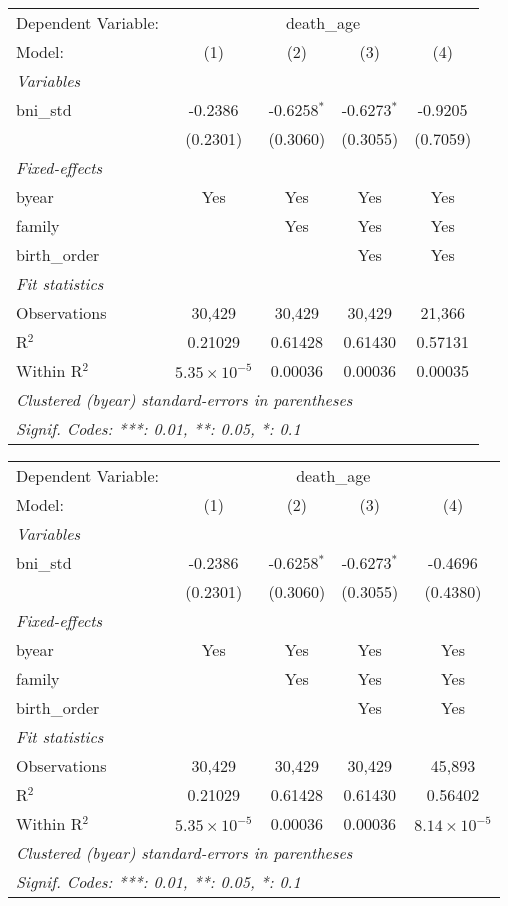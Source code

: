 \begin{tabular}{lcccc}
\tabularnewline\midrule\midrule
Dependent Variable: & \multicolumn{4}{c}{death\_age}\\
Model: & (1) & (2) & (3) & (4)\\
\midrule \emph{Variables} &   &   &   &  \\
bni\_std & -0.2386 & -0.6258$^{*}$ & -0.6273$^{*}$ & -0.9205\\
  & (0.2301) & (0.3060) & (0.3055) & (0.7059)\\
\midrule \emph{Fixed-effects} &   &   &   &  \\
byear & Yes & Yes & Yes & Yes\\
family &  & Yes & Yes & Yes\\
birth\_order &  &  & Yes & Yes\\
\midrule \emph{Fit statistics} &   &   &   &  \\
Observations & 30,429 & 30,429 & 30,429 & 21,366\\
R$^2$ & 0.21029 & 0.61428 & 0.61430 & 0.57131\\
Within R$^2$ & $5.35\times 10^{-5}$ & 0.00036 & 0.00036 & 0.00035\\
\midrule\midrule\multicolumn{5}{l}{\emph{Clustered (byear) standard-errors in parentheses}}\\
\multicolumn{5}{l}{\emph{Signif. Codes: ***: 0.01, **: 0.05, *: 0.1}}\\
\end{tabular}



\begin{tabular}{lcccc}
\tabularnewline\midrule\midrule
Dependent Variable: & \multicolumn{4}{c}{death\_age}\\
Model: & (1) & (2) & (3) & (4)\\
\midrule \emph{Variables} &   &   &   &  \\
bni\_std & -0.2386 & -0.6258$^{*}$ & -0.6273$^{*}$ & -0.4696\\
  & (0.2301) & (0.3060) & (0.3055) & (0.4380)\\
\midrule \emph{Fixed-effects} &   &   &   &  \\
byear & Yes & Yes & Yes & Yes\\
family &  & Yes & Yes & Yes\\
birth\_order &  &  & Yes & Yes\\
\midrule \emph{Fit statistics} &   &   &   &  \\
Observations & 30,429 & 30,429 & 30,429 & 45,893\\
R$^2$ & 0.21029 & 0.61428 & 0.61430 & 0.56402\\
Within R$^2$ & $5.35\times 10^{-5}$ & 0.00036 & 0.00036 & $8.14\times 10^{-5}$\\
\midrule\midrule\multicolumn{5}{l}{\emph{Clustered (byear) standard-errors in parentheses}}\\
\multicolumn{5}{l}{\emph{Signif. Codes: ***: 0.01, **: 0.05, *: 0.1}}\\
\end{tabular}



